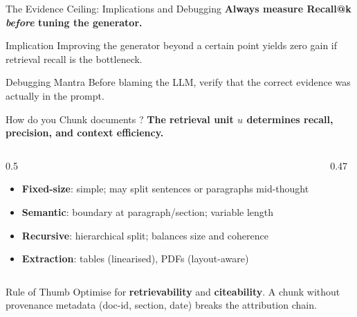 \documentclass[aspectratio=169, xcolor=table]{beamer}
\newif\ifanimated
\newcommand{\cpause}{\ifanimated\pause\fi}
\begin{document}
\begin{frame}{The Evidence Ceiling: Implications and Debugging}
\textbf{Always measure Recall@k \emph{before} tuning the generator.}

\vspace{0.7em}
\begin{block}{Implication}
Improving the generator beyond a certain point yields zero gain if retrieval recall is the bottleneck.
\end{block}

\vspace{0.5em}
\cpause
\begin{block}{Debugging Mantra}
Before blaming the LLM, verify that the correct evidence was actually in the prompt.
\end{block}
\end{frame}

\begin{frame}[shrink=10]{How do you Chunk documents ? }
\textbf{The retrieval unit $u$ determines recall, precision, and context efficiency.}
\cpause

\vspace{0.7em}
\begin{columns}[T]
\begin{column}{0.5\textwidth}
\begin{itemize}
  \item \textbf{Fixed-size}: simple; may split sentences or paragraphs mid-thought
  \item \textbf{Semantic}: boundary at paragraph/section; variable length
  \item \textbf{Recursive}: hierarchical split; balances size and coherence
  \item \textbf{Extraction}: tables (linearised), PDFs (layout-aware)
\end{itemize}
\end{column}
\begin{column}{0.47\textwidth}
\begin{center}
\resizebox{0.95\textwidth}{!}{

}
\end{center}
\end{column}
\end{columns}

\cpause
\vspace{0.4em}
\begin{block}{Rule of Thumb}
Optimise for \textbf{retrievability} and \textbf{citeability}.
A chunk without provenance metadata (doc-id, section, date) breaks the attribution chain.
\end{block}
\end{frame}
\end{document}
